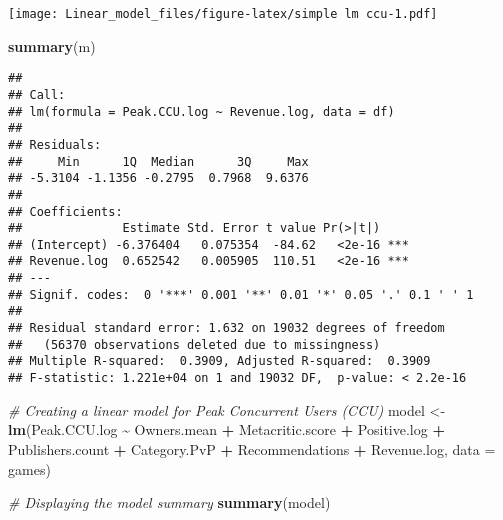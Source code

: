\documentclass[
]{article}
\newenvironment{Shaded}{\begin{snugshade}}{\end{snugshade}}
\newcommand{\AttributeTok}[1]{\textcolor[rgb]{0.13,0.29,0.53}{#1}}
\newcommand{\CommentTok}[1]{\textcolor[rgb]{0.56,0.35,0.01}{\textit{#1}}}
\newcommand{\FunctionTok}[1]{\textcolor[rgb]{0.13,0.29,0.53}{\textbf{#1}}}
\newcommand{\NormalTok}[1]{#1}
\newcommand{\OtherTok}[1]{\textcolor[rgb]{0.56,0.35,0.01}{#1}}
\newcommand{\SpecialCharTok}[1]{\textcolor[rgb]{0.81,0.36,0.00}{\textbf{#1}}}
\begin{document}
\texttt{[image: Linear\_model\_files/figure-latex/simple lm ccu-1.pdf]}

\begin{Shaded}
\begin{Highlighting}[]
\FunctionTok{summary}\NormalTok{(m)}
\end{Highlighting}
\end{Shaded}

\begin{verbatim}
## 
## Call:
## lm(formula = Peak.CCU.log ~ Revenue.log, data = df)
## 
## Residuals:
##     Min      1Q  Median      3Q     Max 
## -5.3104 -1.1356 -0.2795  0.7968  9.6376 
## 
## Coefficients:
##              Estimate Std. Error t value Pr(>|t|)    
## (Intercept) -6.376404   0.075354  -84.62   <2e-16 ***
## Revenue.log  0.652542   0.005905  110.51   <2e-16 ***
## ---
## Signif. codes:  0 '***' 0.001 '**' 0.01 '*' 0.05 '.' 0.1 ' ' 1
## 
## Residual standard error: 1.632 on 19032 degrees of freedom
##   (56370 observations deleted due to missingness)
## Multiple R-squared:  0.3909, Adjusted R-squared:  0.3909 
## F-statistic: 1.221e+04 on 1 and 19032 DF,  p-value: < 2.2e-16
\end{verbatim}

\begin{Shaded}
\begin{Highlighting}[]
\CommentTok{\# Creating a linear model for Peak Concurrent Users (CCU)}
\NormalTok{model }\OtherTok{\textless{}{-}} \FunctionTok{lm}\NormalTok{(Peak.CCU.log }\SpecialCharTok{\textasciitilde{}}\NormalTok{ Owners.mean }\SpecialCharTok{+}\NormalTok{ Metacritic.score }\SpecialCharTok{+}\NormalTok{ Positive.log }\SpecialCharTok{+} 
\NormalTok{              Publishers.count }\SpecialCharTok{+}\NormalTok{ Category.PvP }\SpecialCharTok{+}\NormalTok{ Recommendations }\SpecialCharTok{+}
\NormalTok{              Revenue.log, }\AttributeTok{data =}\NormalTok{ games)}

\CommentTok{\# Displaying the model summary}
\FunctionTok{summary}\NormalTok{(model)}
\end{Highlighting}
\end{Shaded}
\end{document}
